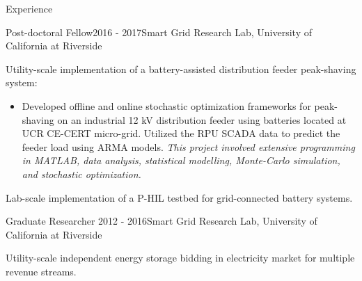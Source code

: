 \documentclass{resume} %
\begin{document}
\begin{rSection}{ Experience}
\begin{rSubsection}{Post-doctoral Fellow}{2016 - 2017}{Smart Grid Research Lab, University of California at Riverside}{}
\vspace{0.26cm}

\item[]  Utility-scale implementation of a battery-assisted distribution feeder peak-shaving system:

\begin{itemize}
\item [] Developed  offline and online  stochastic optimization frameworks for peak-shaving on an industrial 12 kV distribution feeder using batteries located at UCR CE-CERT micro-grid.
Utilized the RPU  SCADA data  to predict the feeder load using ARMA models.%
\emph{This project involved extensive programming in MATLAB, data analysis, statistical modelling, Monte-Carlo simulation, and stochastic optimization.}%
\end{itemize}
\item[] Lab-scale implementation of a P-HIL testbed for grid-connected battery systems.
%
\end{rSubsection}

\begin{rSubsection}{Graduate Researcher}{ 2012 - 2016}{Smart Grid Research Lab, University of California at Riverside}{}
\vspace{0.26cm}



\item[] Utility-scale independent energy storage bidding in  electricity market for multiple revenue streams.


\end{rSubsection}
\end{rSection}
\end{document}
